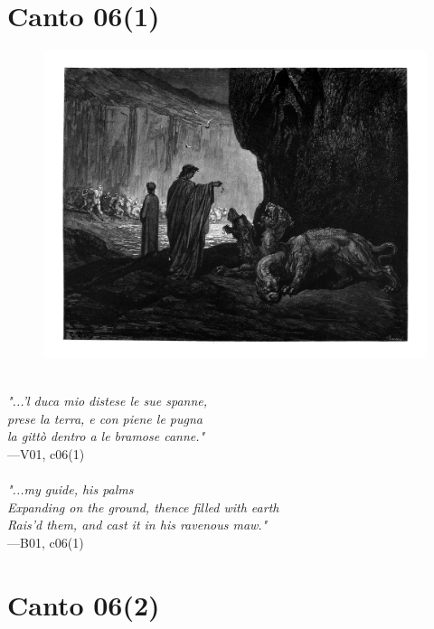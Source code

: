 \documentclass[../Dore_vision.tex]{subfiles}
\begin{document}
\newpage

\section{Canto 06(1)}

\begin{figure}[ht]
\centering
\includegraphics[height=\figsize]{illustrations/book_1/V01, c06(1).jpg}
\end{figure}

\begin{center}
\begin{minipage}{0.8\linewidth}
\textit{\\
"...’l duca mio distese le sue spanne,\\prese la terra, e con piene le pugna\\la gitt\`o dentro a le bramose canne."} \\
—V01, c06(1) \\~\\
\textit{"...my guide, his palms\\Expanding on the ground, thence filled with earth\\Rais'd them, and cast it in his ravenous maw."} \\
—B01, c06(1)
\end{minipage}
\end{center}

\newpage

\section{Canto 06(2)}
\end{document}
